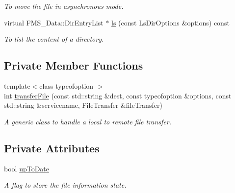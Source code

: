 \begin{DoxyCompactItemize}
\begin{DoxyCompactList}\small\item\em To move the file in asynchronous mode. \item\end{DoxyCompactList}\item 
virtual FMS\_\-Data::DirEntryList $\ast$ \hyperlink{classLocalFileProxy_a06d7fdcf9fca34b2cba9aeee6cb08dc4}{ls} (const LsDirOptions \&options) const 
\begin{DoxyCompactList}\small\item\em To list the content of a directory. \item\end{DoxyCompactList}\end{DoxyCompactItemize}
\subsection*{Private Member Functions}
\begin{DoxyCompactItemize}
\item 
{\footnotesize template$<$class typeofoption $>$ }\\int \hyperlink{classLocalFileProxy_abbb7512da9f5692274d04bae413bc114}{transferFile} (const std::string \&dest, const typeofoption \&options, const std::string \&servicename, FileTransfer \&fileTransfer)
\begin{DoxyCompactList}\small\item\em A generic class to handle a local to remote file transfer. \item\end{DoxyCompactList}\end{DoxyCompactItemize}
\subsection*{Private Attributes}
\begin{DoxyCompactItemize}
\item 
\hypertarget{classLocalFileProxy_af82c963e0251fb01ab3fe02f3ac9a50f}{
bool \hyperlink{classLocalFileProxy_af82c963e0251fb01ab3fe02f3ac9a50f}{upToDate}}
\label{classLocalFileProxy_af82c963e0251fb01ab3fe02f3ac9a50f}

\begin{DoxyCompactList}\small\item\em A flag to store the file information state. \item\end{DoxyCompactList}\end{DoxyCompactItemize}


